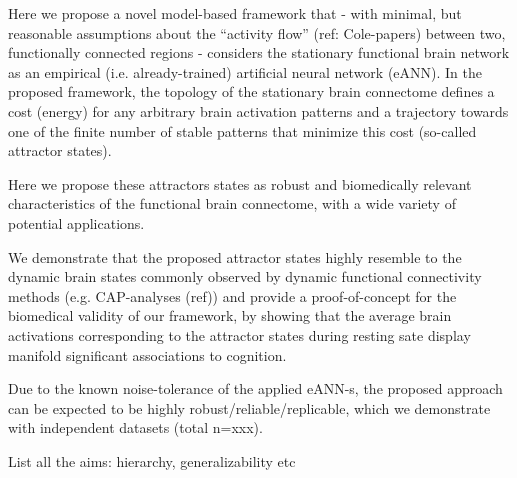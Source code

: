 \documentclass[twocolumn, switch]{article}
\begin{document}
Here we propose a novel model-based framework that - with minimal, but reasonable assumptions about the ``activity flow'' (ref: Cole-papers) between two, functionally connected regions - considers the stationary functional brain network as an empirical (i.e. already-trained) artificial neural network (eANN). In the proposed framework, the topology of the stationary brain connectome defines a cost (energy) for any arbitrary brain activation patterns and a trajectory towards one of the finite number of stable patterns that minimize this cost (so-called attractor states).

Here we propose these attractors states as robust and biomedically relevant characteristics of the functional brain connectome, with a wide variety of potential applications.

We demonstrate that the proposed attractor states highly resemble to the dynamic brain states commonly observed by dynamic functional connectivity methods (e.g. CAP-analyses (ref)) and provide a proof-of-concept for the biomedical validity of our framework, by showing that the average brain activations corresponding to the attractor states during resting sate display manifold significant associations to cognition.

Due to the known noise-tolerance of the applied eANN-s, the proposed approach can be expected to be highly robust/reliable/replicable, which we demonstrate with independent datasets (total n=xxx).

List all the aims: hierarchy, generalizability etc




\end{document}
